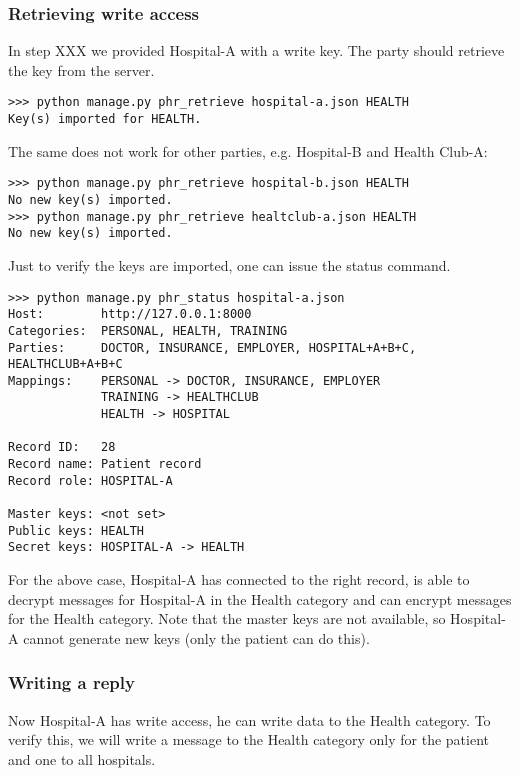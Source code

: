 \documentclass[a4paper]{article}
\begin{document}
		\subsubsection{Retrieving write access}
			In step XXX we provided Hospital-A with a write key. The party should retrieve the key from the server.
			
			\begin{lstlisting}
>>> python manage.py phr_retrieve hospital-a.json HEALTH
Key(s) imported for HEALTH.
			\end{lstlisting}
			
			The same does not work for other parties, e.g. Hospital-B and Health Club-A:
		
			\begin{lstlisting}
>>> python manage.py phr_retrieve hospital-b.json HEALTH
No new key(s) imported.
>>> python manage.py phr_retrieve healtclub-a.json HEALTH
No new key(s) imported.
			\end{lstlisting}
		
			Just to verify the keys are imported, one can issue the status command.
			
			\begin{lstlisting}
>>> python manage.py phr_status hospital-a.json
Host:        http://127.0.0.1:8000
Categories:  PERSONAL, HEALTH, TRAINING
Parties:     DOCTOR, INSURANCE, EMPLOYER, HOSPITAL+A+B+C, HEALTHCLUB+A+B+C
Mappings:    PERSONAL -> DOCTOR, INSURANCE, EMPLOYER
             TRAINING -> HEALTHCLUB
             HEALTH -> HOSPITAL

Record ID:   28
Record name: Patient record
Record role: HOSPITAL-A

Master keys: <not set>
Public keys: HEALTH
Secret keys: HOSPITAL-A -> HEALTH
			\end{lstlisting}
			
			For the above case, Hospital-A has connected to the right record, is able to decrypt messages for Hospital-A in the Health category and can encrypt messages for the Health category. Note that the master keys are not available, so Hospital-A cannot generate new keys (only the patient can do this).
		
		\subsubsection{Writing a reply}
			Now Hospital-A has write access, he can write data to the Health category. To verify this, we will write a message to the Health category only for the patient and one to all hospitals.
			
\end{document}
